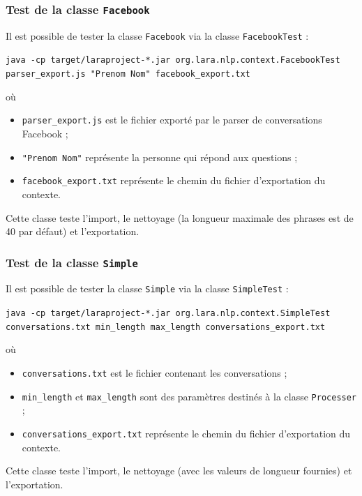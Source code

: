 \documentclass[10pt,a4paper]{article}
\begin{document}
\subsubsection{Test de la classe \texttt{Facebook}}
Il est possible de tester la classe \texttt{Facebook} via la classe \texttt{FacebookTest} :
\begin{center}
\texttt{java -cp target/laraproject-*.jar org.lara.nlp.context.FacebookTest parser\_export.js "Prenom Nom" facebook\_export.txt}
\end{center}
où
\begin{itemize}
\item \texttt{parser\_export.js} est le fichier exporté par le parser de conversations Facebook ;
\item \texttt{"Prenom Nom"} représente la personne qui répond aux questions ;
\item \texttt{facebook\_export.txt} représente le chemin du fichier d'exportation du contexte.
\end{itemize}
Cette classe teste l'import, le nettoyage (la longueur maximale des phrases est de 40 par défaut) et l'exportation.
\subsubsection{Test de la classe \texttt{Simple}}
Il est possible de tester la classe \texttt{Simple} via la classe \texttt{SimpleTest} :
\begin{center}
\texttt{java -cp target/laraproject-*.jar org.lara.nlp.context.SimpleTest conversations.txt min\_length max\_length conversations\_export.txt}
\end{center}
où
\begin{itemize}
\item \texttt{conversations.txt} est le fichier contenant les conversations ;
\item \texttt{min\_length} et \texttt{max\_length} sont des paramètres destinés à la classe \texttt{Processer} ;
\item \texttt{conversations\_export.txt} représente le chemin du fichier d'exportation du contexte.
\end{itemize}
Cette classe teste l'import, le nettoyage (avec les valeurs de longueur fournies) et l'exportation.
\end{document}
